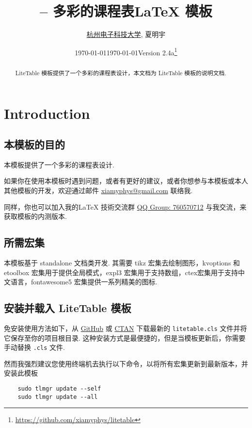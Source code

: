 \documentclass[11pt]{article}
\title{\bfseries\pkg{LiteTable} -- 多彩的课程表\textsf{\LaTeX} 模板}
\author{\href{https://www.hdu.edu.cn}{杭州电子科技大学}, 夏明宇}
\date{\today}
\affil{\href{mailto:xiamyphys@gmail.com}{\texttt{xiamyphys@gmail.com}}}
\date{\today\quad Version 2.4a\thanks{%
  \url{https://github.com/xiamyphys/litetable}}}
\def\pkg#1{\texorpdfstring{\textcolor{pkgcolor}{\textsf{#1}}}{“#1”}}
\begin{document}
\maketitle

\vspace{-2em}
\begin{abstract}
\pkg{LiteTable} 模板提供了一个多彩的课程表设计，本文档为 \pkg{LiteTable} 模板的说明文档.
\end{abstract}

\tableofcontents

\clearpage

\section{Introduction}

\subsection{本模板的目的}
本模板提供了一个多彩的课程表设计. 

如果你在使用本模板时遇到问题，或者有更好的建议，或者你想参与本模板或本人其他模板的开发，欢迎通过邮件 \href{mailto:xiamyphys@gmail.com}{xiamyphys@gmail.com} 联络我.

同样，你也可以加入我的\textsf\LaTeX{} 技術交流群 \href{https://qm.qq.com/q/OnHzbNvVAG}{QQ Group: 760570712} 与我交流，来获取模板的内测版本.

\subsection{所需宏集}
本模板基于 \pkg{standalone} 文档类开发. 其需要 \pkg{tikz} 宏集去绘制图形，\pkg{kvoptions} 和 \pkg{etoolbox} 宏集用于提供全局模式，\pkg{expl3} 宏集用于支持数组，\pkg{ctex}宏集用于支持中文语言，\pkg{fontawesome5} 宏集提供一系列精美的图标.

\subsection{安装并载入 \pkg{LiteTable} 模板}
免安装使用方法如下，从 \href{https://github.com/xiamyphys/LiteTable}{GitHub} 或 \href{https://ctan.org/pkg/litetable}{CTAN} 下载最新的 \verb|litetable.cls| 文件并将它保存至你的项目根目录. 这种安装方式是最便捷的，但是当模板更新后，你需要手动替换 \verb|.cls| 文件.

然而我强烈建议您使用终端机去执行以下命令，以将所有宏集更新到最新版本，并安装此模板
\begin{verbatim}
    sudo tlmgr update --self
    sudo tlmgr update --all
\end{verbatim}
\end{document}
